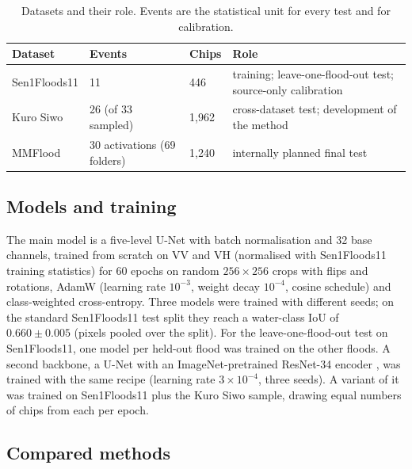 \documentclass[a4paper,fleqn]{cas-sc}
\begin{document}
\begin{table}[t]
\caption{Datasets and their role. Events are the statistical unit for every test and for calibration.}
\label{tab:data}
\centering
\begin{tabular}{llll}
\toprule
Dataset & Events & Chips & Role \\
\midrule
Sen1Floods11 & 11 & 446 & training; leave-one-flood-out test; source-only calibration \\
Kuro Siwo & 26 (of 33 sampled) & 1,962 & cross-dataset test; development of the method \\
MMFlood & 30 activations (69 folders) & 1,240 & internally planned final test \\
\bottomrule
\end{tabular}
\end{table}

\subsection{Models and training}
The main model is a five-level U-Net \citep{ronneberger2015unet} with batch normalisation \citep{ioffe2015bn} and 32 base channels, trained from scratch on VV and VH (normalised with Sen1Floods11 training statistics) for 60 epochs on random $256\times256$ crops with flips and rotations, AdamW \citep{loshchilov2019adamw} (learning rate $10^{-3}$, weight decay $10^{-4}$, cosine schedule) and class-weighted cross-entropy. Three models were trained with different seeds; on the standard Sen1Floods11 test split they reach a water-class IoU of $0.660\pm0.005$ (pixels pooled over the split). For the leave-one-flood-out test on Sen1Floods11, one model per held-out flood was trained on the other floods. A second backbone, a U-Net with an ImageNet-pretrained \citep{deng2009imagenet} ResNet-34 encoder \citep{he2016resnet,iakubovskii2019smp}, was trained with the same recipe (learning rate $3\times10^{-4}$, three seeds). A variant of it was trained on Sen1Floods11 plus the Kuro Siwo sample, drawing equal numbers of chips from each per epoch.

\subsection{Compared methods}
\label{sec:compared}
\end{document}
